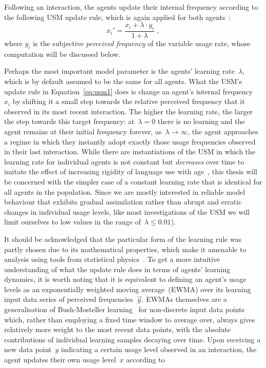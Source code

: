 Following an interaction, the agents update their internal frequency according to the following USM update rule, which is again applied for both agents~\citep[p.4]{Baxter2006}:
\begin{equation}\label{eq:usm1}
x_i' = \frac{x_i+\lambda\cdot y_i}{1+\lambda}\;,
\end{equation}
where $y_i$ is the subjective \emph{perceived frequency} of the variable usage rate, whose computation will be discussed below.


Perhaps the most important model parameter is the agents' learning rate~$\lambda$, which is by default assumed to be the same for all agents. What the USM's update rule in Equation~\ref{eq:usm1} does is change an agent's internal frequency~$x_i$ by shifting it a small step towards the relative perceived frequency that it observed in its most recent interaction.
The higher the learning rate, the larger the step towards this target frequency: at~$\lambda=0$ there is no learning and the agent remains at their initial frequency forever, as~$\lambda\rightarrow\infty$, the agent approaches a regime in which they instantly adopt exactly those usage frequencies observed in their last interaction.
While there are instantiations of the USM in which the learning rate for individual agents is not constant but \emph{decreases} over time to imitate the effect of increasing rigidity of language use with age~\citep{Baxter2016}, this thesis will be concerned with the simpler case of a constant learning rate that is identical for all agents in the population.
Since we are mostly interested in reliable model behaviour that exhibits gradual assimilation rather than abrupt and erratic changes in individual usage levels, like most investigations of the USM we will limit ourselves to low values in the range of~$\lambda\le0.01$).

It should be acknowledged that the particular form of the learning rule was partly chosen due to its mathematical properties, which make it amenable to analysis using tools from statistical physics~\citep[see in particular][]{Baxter2006}. To get a more intuitive understanding of what the update rule does in terms of agents' learning dynamics, it is worth noting that it is equivalent to defining an agent's usage levels as an exponentially weighted moving average~(EWMA) over its learning input data series of perceived frequencies~$\vec{y}$.
EWMAs themselves are a generalisation of Bush-Mosteller learning~\citep{Bush1955} for non-discrete input data points which, rather than employing a fixed time window to average over, always gives relatively more weight to the most recent data points, with the absolute contributions of individual learning samples decaying over time.
Upon receiving a new data point~$y$ indicating a certain usage level observed in an interaction, the agent updates their own usage level~$x$ according to

